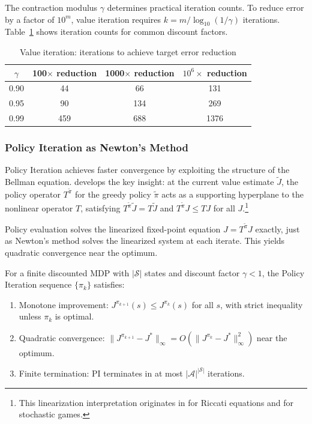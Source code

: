 The contraction modulus $\gamma$ determines practical iteration counts. To reduce error by a factor of $10^m$, value iteration requires $k = m / \log_{10}(1/\gamma)$ iterations. Table~\ref{tab:vi_iterations} shows iteration counts for common discount factors.

\begin{table}[h!]
\centering
\caption{Value iteration: iterations to achieve target error reduction}
\label{tab:vi_iterations}
\begin{tabular}{c|ccc}
\hline
$\gamma$ & 100$\times$ reduction & 1000$\times$ reduction & $10^6\times$ reduction \\
\hline
0.90 & 44 & 66 & 131 \\
0.95 & 90 & 134 & 269 \\
0.99 & 459 & 688 & 1376 \\
\hline
\end{tabular}
\end{table}


\subsubsection{Policy Iteration as Newton's Method}

Policy Iteration achieves faster convergence by exploiting the structure of the Bellman equation. \citet{bertsekas2022} develops the key insight: at the current value estimate $\tilde{J}$, the policy operator $T^{\tilde{\pi}}$ for the greedy policy $\tilde{\pi}$ acts as a supporting hyperplane to the nonlinear operator $T$, satisfying $T^{\tilde{\pi}} \tilde{J} = T\tilde{J}$ and $T^{\tilde{\pi}} J \leq TJ$ for all $J$.\footnote{This linearization interpretation originates in \citet{kleinman1968} for Riccati equations and \citet{pollatschek1969} for stochastic games.}

Policy evaluation solves the linearized fixed-point equation $J = T^{\tilde{\pi}} J$ exactly, just as Newton's method solves the linearized system at each iterate. This yields quadratic convergence near the optimum.

\begin{theorem}
\label{thm:pi_quadratic}
For a finite discounted MDP with $|\mathcal{S}|$ states and discount factor $\gamma < 1$, the Policy Iteration sequence $\{\pi_k\}$ satisfies:
\begin{enumerate}
\item[(a)] Monotone improvement: $J^{\pi_{k+1}}(s) \leq J^{\pi_k}(s)$ for all $s$, with strict inequality unless $\pi_k$ is optimal.
\item[(b)] Quadratic convergence: $\|J^{\pi_{k+1}} - J^*\|_\infty = O(\|J^{\pi_k} - J^*\|_\infty^2)$ near the optimum.
\item[(c)] Finite termination: PI terminates in at most $|\mathcal{A}|^{|\mathcal{S}|}$ iterations.
\end{enumerate}
\end{theorem}

